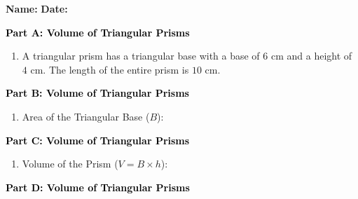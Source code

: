 \documentclass[12pt, letterpaper, fleqn]{article}
\newcommand{\blanklong}{\underline{\hspace{6.5cm}}}
\begin{document}
\textbf{Name:} \underline{\hspace{5cm}}
\hfill
\textbf{Date:} \underline{\hspace{3cm}}\\

\begin{tcolorbox}[colback=customteal!20]
\large\textcolor{black}{\textbf{Part A: Volume of Triangular Prisms}}
\end{tcolorbox}

\vspace{3mm}

\begin{enumerate}[itemsep=2.5cm, leftmargin=0.6cm]
\item A triangular prism has a triangular base with a base of $6\text{ cm}$ and a height of $4\text{ cm}$. The length of the entire prism is $10\text{ cm}$.
\end{enumerate}

\newpage

\begin{tcolorbox}[colback=customteal!20]
\large\textcolor{black}{\textbf{Part B: Volume of Triangular Prisms}}
\end{tcolorbox}

\vspace{3mm}

\begin{enumerate}[itemsep=2.5cm, leftmargin=0.6cm, resume]
\item Area of the Triangular Base ($B$): \blanklong
\end{enumerate}

\newpage

\begin{tcolorbox}[colback=customteal!20]
\large\textcolor{black}{\textbf{Part C: Volume of Triangular Prisms}}
\end{tcolorbox}

\vspace{3mm}

\begin{enumerate}[itemsep=2.5cm, leftmargin=0.6cm, resume]
\item Volume of the Prism ($V = B \times h$): \blanklong
\end{enumerate}

\newpage

\begin{tcolorbox}[colback=customteal!20]
\large\textcolor{black}{\textbf{Part D: Volume of Triangular Prisms}}
\end{tcolorbox}
\end{document}
